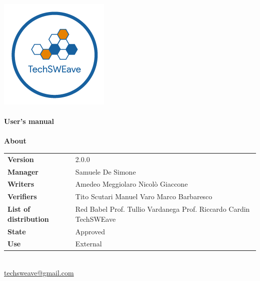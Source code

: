 \documentclass[a4paper]{article}
\begin{document}
\begin{titlepage}
    \begin{center}
        \includegraphics{../../../../Images/logo.png}\\
        \vspace{20px}
        \textcolor{logo}{\hrulefill}\\
        \vspace{20px}
        \textbf{\huge\textcolor{logo}{User's manual}}\\
        \vspace{10px}
        \textcolor{logo}{\hrulefill}\\
        \vspace{40px}
        \textbf{\Large About}\\
        \vspace{20px}
        \begin{tabular}{p{100px} | p{100px}}
            \textbf{Version}              & 2.0.0                                                                                        \\
            \textbf{Manager}              & Samuele De Simone                                                                            \\
            \textbf{Writers}              & Amedeo Meggiolaro \newline Nicolò Giaccone                                                   \\
            \textbf{Verifiers}            & Tito Scutari \newline Manuel Varo  \newline Marco Barbaresco                                 \\
            \textbf{List of distribution} & Red Babel \newline Prof. Tullio Vardanega \newline Prof. Riccardo Cardin \newline TechSWEave \\
            \textbf{State}                & Approved                                                                                     \\
            \textbf{Use}                  & External                                                                                     \\
        \end{tabular}\\
        \vspace{60px}
        \href{mailto:techsweave@gmail.com}{techsweave@gmail.com}\\


\end{center}
\end{titlepage}
\end{document}
